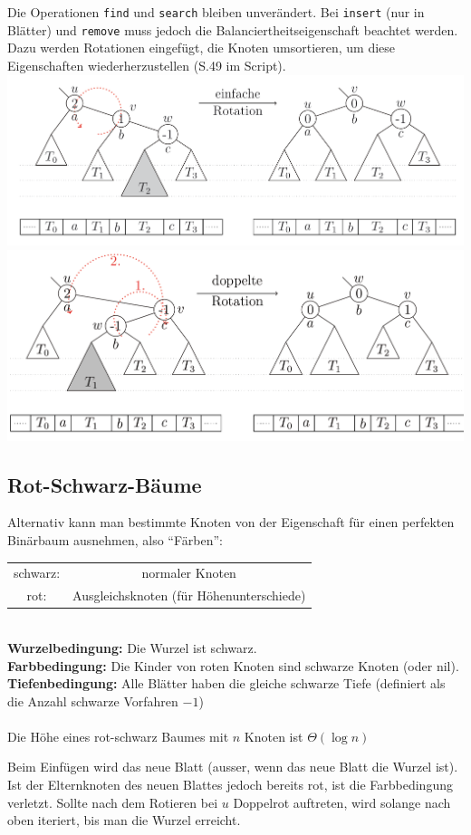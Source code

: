 \documentclass{scrartcl}
\begin{document}
Die Operationen \texttt{find} und \texttt{search} bleiben unverändert. Bei \texttt{insert} (nur in Blätter) und \texttt{remove} muss jedoch die Balanciertheitseigenschaft beachtet werden. Dazu werden Rotationen eingefügt, die Knoten umsortieren, um diese Eigenschaften wiederherzustellen (S.49 im Script). \\
\includegraphics[width=\textwidth]{images/AVL-einfacheRotation.png} \\
\includegraphics[width=\textwidth]{images/AVL-doppelteRotation.png}

\subsection{Rot-Schwarz-Bäume}
Alternativ kann man bestimmte Knoten von der Eigenschaft für einen perfekten Binärbaum ausnehmen, also "`Färben"':

\begin{shaded}
\begin{tabular}{cc}
schwarz: & normaler Knoten \\
rot: & Ausgleichsknoten (für Höhenunterschiede) \\
\end{tabular}\\
\textbf{Wurzelbedingung:} Die Wurzel ist schwarz. \\
\textbf{Farbbedingung:} Die Kinder von roten Knoten sind schwarze Knoten (oder nil). \\
\textbf{Tiefenbedingung:} Alle Blätter haben die gleiche schwarze Tiefe (definiert als die Anzahl schwarze Vorfahren $-1$) \\ \ \\
Die Höhe eines rot-schwarz Baumes mit $n$ Knoten ist $\Theta(\log n)$
\end{shaded}
Beim Einfügen wird das neue Blatt  (ausser, wenn das neue Blatt die Wurzel ist). Ist der Elternknoten des neuen Blattes jedoch bereits rot, ist die Farbbedingung verletzt. Sollte nach dem Rotieren bei $u$ Doppelrot auftreten, wird solange nach oben iteriert, bis man die Wurzel erreicht.\\
\end{document}
